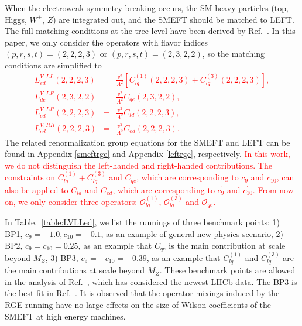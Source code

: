 \documentclass[a4paper,11pt]{article}
\begin{document}
When the electroweak symmetry breaking occurs, the SM heavy particles (top, Higgs,  $W^\pm$,  $Z$) are integrated out, and the SMEFT should be matched to LEFT. 
The full matching conditions at the tree level have been derived by Ref.~\cite{Jenkins:2017jig}.
In this paper, we only consider the operators with flavor indices $(p,r,s,t)=(2,2,2,3)$ or $(p,r,s,t)=(2,3,2,2)$, so the matching conditions are simplified to 
\textcolor{red}{
\begin{eqnarray}
    L^{V,LL}_{ed}(2,2,2,3) &=& \frac{v^2}{\Lambda^2}\left[C^{(1)}_{lq}(2,2,2,3)+C^{(3)}_{lq}(2,2,2,3)\right],  \label{match:VLLed}\\
    L^{V,LR}_{de}(2,3,2,2)&=& \frac{v^2}{\Lambda^2}C_{qe}(2,3,2,2), \label{match:VLRde} \\
    L^{V,LR}_{ed}(2,2,2,3)&=& \frac{v^2}{\Lambda^2}C_{ld}(2,2,2,3), \label{match:VLRed} \\
    L^{V,RR}_{ed}(2,2,2,3)&=& \frac{v^2}{\Lambda^2}C_{ed}(2,2,2,3). \label{match:VRRed}
\end{eqnarray}
}
The related renormalization group equations for the SMEFT and LEFT can be found in Appendix \ref{smeftrge} and Appendix \ref{leftrge}, respectively.
\textcolor{red}{
In this work, we do not distinguish the left-handed and right-handed contributions. 
The constraints on $C^{(1)}_{lq}+C^{(3)}_{lq}$ and $C_{qe}$, 
which are corresponding to $c_{9}$ and $c_{10}$, 
can also be applied to $C_{ld}$ and $C_{ed}$, 
which are corresponding to $c^{\prime}_{9}$ and $c^{\prime}_{10}$.
From now on, we only consider three operators: 
$\mathcal{O}^{(1)}_{lq}$, $\mathcal{O}^{(3)}_{lq}$ and $\mathcal{O}_{qe}$.
}

In Table.~\ref{table:LVLLed}, we list the runnings of three benchmark points: 
1) BP1, $c_{9}=-1.0, c_{10}=-0.1$, as an example of general new physics scenario, 
2) BP2, $c_{9}=c_{10}=0.25$, as an example that $C_{qe}$ is the main contribution at scale beyond $M_Z$,
3) BP3, $c_{9}=-c_{10}=-0.39$, as an example that $C^{(1)}_{lq}$ and $C^{(3)}_{lq}$ are the main contributions at scale beyond $M_Z$. 
These benchmark points are allowed in the analysis of Ref.~\cite{Ciuchini:2022wbq}, 
which has considered the newest LHCb data.
The BP3 is the best fit in Ref.~\cite{Altmannshofer:2021qrr}. 
It is observed that the operator mixings induced by the RGE running have no large effects on the size of Wilson coefficients of the SMEFT at high energy machines.
\end{document}
